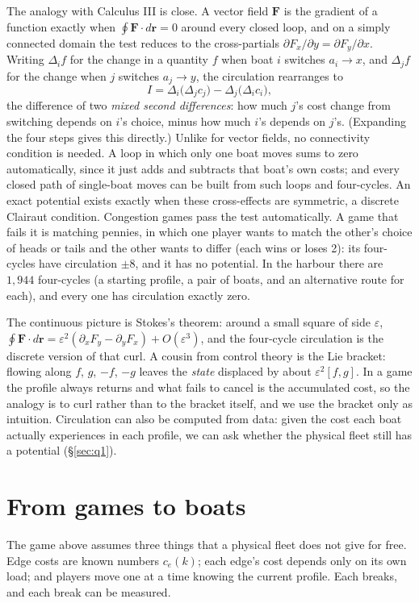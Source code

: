 \documentclass[11pt]{article}
\theoremstyle{definition}
\begin{document}
The analogy with Calculus III is close. A vector field $\mathbf F$ is the gradient of a function exactly when $\oint\mathbf F\cdot d\mathbf r=0$ around every closed loop, and on a simply connected domain the test reduces to the cross-partials $\partial F_x/\partial y=\partial F_y/\partial x$. Writing $\Delta_i f$ for the change in a quantity $f$ when boat $i$ switches $a_i\to x$, and $\Delta_j f$ for the change when $j$ switches $a_j\to y$, the circulation rearranges to
\[
I=\Delta_i\big(\Delta_j c_j\big)-\Delta_j\big(\Delta_i c_i\big),
\]
the difference of two \emph{mixed second differences}: how much $j$'s cost change from switching depends on $i$'s choice, minus how much $i$'s depends on $j$'s. (Expanding the four steps gives this directly.) Unlike for vector fields, no connectivity condition is needed. A loop in which only one boat moves sums to zero automatically, since it just adds and subtracts that boat's own costs; and every closed path of single-boat moves can be built from such loops and four-cycles. An exact potential exists exactly when these cross-effects are symmetric, a discrete Clairaut condition. Congestion games pass the test automatically. A game that fails it is matching pennies, in which one player wants to match the other's choice of heads or tails and the other wants to differ (each wins or loses 2): its four-cycles have circulation $\pm8$, and it has no potential. In the harbour there are $1{,}944$ four-cycles (a starting profile, a pair of boats, and an alternative route for each), and every one has circulation exactly zero.

The continuous picture is Stokes's theorem: around a small square of side $\varepsilon$, $\oint\mathbf F\cdot d\mathbf r=\varepsilon^2(\partial_xF_y-\partial_yF_x)+O(\varepsilon^3)$, and the four-cycle circulation is the discrete version of that curl. A cousin from control theory is the Lie bracket: flowing along $f$, $g$, $-f$, $-g$ leaves the \emph{state} displaced by about $\varepsilon^2[f,g]$. In a game the profile always returns and what fails to cancel is the accumulated cost, so the analogy is to curl rather than to the bracket itself, and we use the bracket only as intuition. Circulation can also be computed from data: given the cost each boat actually experiences in each profile, we can ask whether the physical fleet still has a potential (\S\ref{sec:q1}).

\section{From games to boats}
\label{sec:physics}
The game above assumes three things that a physical fleet does not give for free. Edge costs are known numbers $c_e(k)$; each edge's cost depends only on its own load; and players move one at a time knowing the current profile. Each breaks, and each break can be measured.
\end{document}
